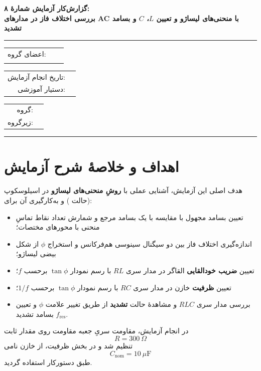 \documentclass[a4paper, 11pt]{article}
\begin{document}
\begin{center}
\textbf{{\huge گزارش‌کار آزمایش شمارهٔ ۸:\\
بررسی اختلاف فاز در مدارهای AC با منحنی‌های لیساژو و تعیین $L$، $C$ و بسامد تشدید}}
\end{center}

\hrule
\noindent\begin{tabular}{rrl}
اعضای گروه: &  &  \\
 &  &  \\
\end{tabular}\hfill
\begin{tabular}{rr}
تاریخ انجام آزمایش: &  \\
دستیار آموزشی: &  \\
\end{tabular}\hfill
\begin{tabular}{rr}
گروه:  &   \\
زیرگروه: &  \lr{}  \\
\end{tabular}
\hrule

\section*{اهداف و خلاصهٔ شرح آزمایش}

هدف اصلی این آزمایش، آشنایی عملی با \textbf{روشِ منحنی‌های لیساژو} در اسیلوسکوپ (حالت ) و به‌کارگیری آن برای:
\begin{itemize}
    \item تعیین بسامد مجهول با مقایسه با یک بسامد مرجع و شمارش تعداد نقاط تماسِ منحنی با محورهای مختصات؛
    \item اندازه‌گیری اختلاف فاز بین دو سیگنال سینوسی هم‌فرکانس و استخراج $\phi$ از شکل بیضی لیساژو؛
    \item تعیین \textbf{ضریب خودالقایی} القاگر در مدار سری $RL$ با رسم نمودار $\tan\phi$ برحسب $f$؛
    \item تعیین \textbf{ظرفیت} خازن در مدار سری $RC$ با رسم نمودار $\tan\phi$ برحسب $1/f$؛
    \item بررسی مدار سری $RLC$ و مشاهدهٔ حالت \textbf{تشدید} از طریق تغییر علامت $\phi$ و تعیین بسامد تشدید $f_{\mathrm{res}}$.
\end{itemize}

در انجام آزمایش، مقاومت سریِ جعبه مقاومت روی مقدار ثابت
\[
R=300~\Omega
\]
تنظیم شد و در بخش ظرفیت، از خازن نامی
\[
C_{\mathrm{nom}}=10~\mu\mathrm{F}
\]
طبق دستورکار استفاده گردید.
\end{document}
